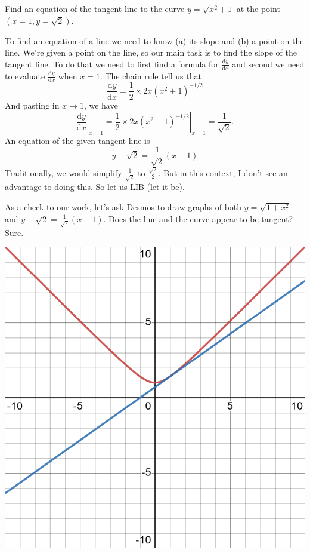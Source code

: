 \documentclass[12pt,fleqn,answers]{exam}
\begin{document}
\begin{questions}


\question Find an equation of the tangent line to the 
curve $y = \sqrt{x^2+1}$ at the point \mbox{$(x=1, y=\sqrt{2})$.}
\begin{solution}[2.5in]

To find an equation of a line we need to know (a) its slope and (b) a point on the
line.  We're given a point on the line, so our main task is to find the slope of the 
tangent line. To do that we need to first find a formula for \(\displaystyle
\frac{\mathrm{d} y}{\mathrm{d} x} \) and second we need to evaluate \(\displaystyle
\frac{\mathrm{d} y}{\mathrm{d} x} \) when $x=1$. The chain rule tell us that
\begin{equation}
    \frac{\mathrm{d} y}{\mathrm{d} x} = \frac{1}{2} \times 2 x (x^2+1)^{-1/2}
\end{equation}
And pasting in $x \to 1$, we have
\begin{equation}
    \left . \frac{\mathrm{d} y}{\mathrm{d} x} \right |_{x=1}=  
    \left . \frac{1}{2} \times 2 x (x^2+1)^{-1/2} \right |_{x=1} =
    \frac{1}{\sqrt{2}}.
\end{equation}
An equation of the given tangent line is
\begin{equation}
  y - \sqrt{2} = \frac{1}{\sqrt{2}} (x-1)
\end{equation}
Traditionally, we would simplify \(\frac{1}{\sqrt{2}}\)
to \(\frac{\sqrt{2}}{2}\). But in this context, I 
don't see an advantage to doing this. So let us LIB 
(let it be).

As a check to our work, let's ask Desmos to draw 
graphs of both $y=\sqrt{1+x^2}$ and $y - \sqrt{2} = \frac{1}{\sqrt{2}} (x-1)$. Does the line and the curve
appear to be tangent?  Sure.

    \centering
    \includegraphics[scale=0.2]{desmos-graph(44).png}


\end{solution}
\end{questions}
\end{document}
